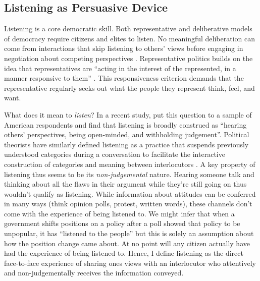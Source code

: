 \documentclass[11pt,a4paper]{scrartcl}
\begin{document}
\subsection{Listening as Persuasive Device}

Listening is a core democratic skill. Both representative and deliberative models of democracy require citizens and elites to listen. No meaningful deliberation can come from interactions that skip listening to others' views before engaging in negotiation about competing perspectives \autocite{scudderListeningCenteredApproachDemocratic2020}. Representative politics builds on the idea that representatives are \enquote{acting in the interest of the represented, in a manner responsive to them} \autocite[209]{pitkinConceptRepresentation1972}. This responsiveness criterion demands that the representative  regularly seeks out what the people they represent think, feel, and want.

What does it mean to \emph{listen}? In a recent study, \textcite[570]{busbyTheyEvenCare2025} put this question to a sample of American respondents and find that listening is broadly construed as \enquote{hearing others' perspectives, being open-minded, and withholding judgement}. Political theorists have similarly defined listening as a practice that suspends previously understood categories during a conversation to facilitate the interactive construction of categories and meaning between interlocutors \autocite[174-177]{dobsonListeningDemocracyRecognition2014}. A key property of listening thus seems to be its \emph{non-judgemental} nature. Hearing someone talk and thinking about all the flaws in their argument while they're still going on thus wouldn't qualify as listening. While information about attitudes can be conferred in many ways (think opinion polls, protest, written words), these channels don't come with the experience of being listened to. We might infer that when a government shifts positions on a policy after a poll showed that policy to be unpopular, it has \enquote{listened to the people} but this is solely an assumption about how the position change came about. At no point will any citizen actually have had the experience of being listened to. Hence, I define listening as the direct face-to-face experience of sharing ones views with an interlocutor who attentively and non-judgementally receives the information conveyed.
\end{document}
